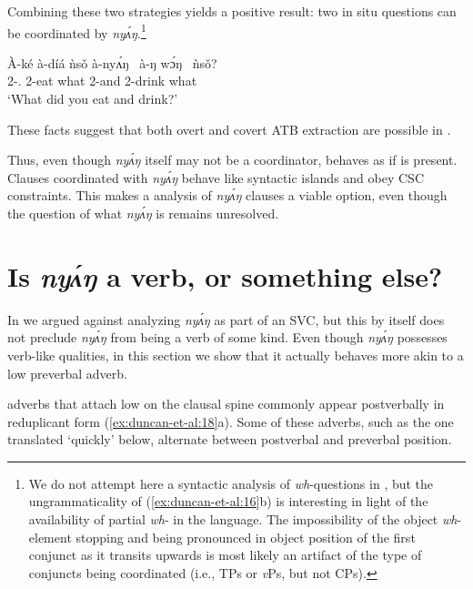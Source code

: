 \documentclass[output=paper,modfonts,nonflat,
]{langsci/langscibook}
\begin{document}
\noindent Combining these two strategies yields a positive result: two {in situ} questions can be coordinated by \textit{ny\'{ʌ}ŋ}.\footnote{We do not attempt here a syntactic analysis of \textit{wh}-questions in , but the ungrammaticality of (\ref{ex:duncan-et-al:16}b) is interesting in light of the availability of partial \textit{wh}- in the language. The impossibility of the object \textit{wh}-element stopping and being pronounced in object position of the first conjunct as it transits upwards is most likely an artifact of the type of conjuncts being coordinated (i.e., TPs or \textit{v}Ps, but not CPs).}

\ea\label{ex:19:covert-ATB-two-obj}
\gll \`{A}-ké à-díá ǹs\v{o} à-ny\'{ʌ}ŋ~ à-ŋ w\'ɔŋ~ ǹs\v{o}? \\
2{\SG-\PST.\FOC} 2{\SG}-eat what 2{\SG}-and 2{\SG}-drink what \\
\glt `What did you eat and drink?'
\z

\noindent These facts suggest that both overt and covert ATB extraction are possible in . 

Thus, even though \textit{ny\'{ʌ}ŋ} itself may not be a coordinator,  behaves as if  is present. Clauses coordinated with \textit{ny\'{ʌ}ŋ} behave like syntactic islands and obey CSC constraints. This makes a  analysis of \textit{ny\'{ʌ}ŋ} clauses a viable option, even though the question of what \textit{ny\'{ʌ}ŋ} is remains unresolved.

\section{Is \textit{ny\'{ʌ}ŋ} a verb, or something else?}\label{sec:duncan-et-al:5}

In  we argued against analyzing \textit{ny\'{ʌ}ŋ} as part of an SVC, but this by itself does not preclude \textit{ny\'{ʌ}ŋ} from being a verb of some kind. Even though \textit{ny\'{ʌ}ŋ} possesses verb-like qualities, in this section we show that it actually behaves more akin to a low preverbal adverb.

 adverbs that attach low on the clausal spine commonly appear postverbally in reduplicant form (\ref{ex:duncan-et-al:18}a). Some of these adverbs, such as the one translated `quickly' below, alternate between postverbal and preverbal position.
\end{document}
